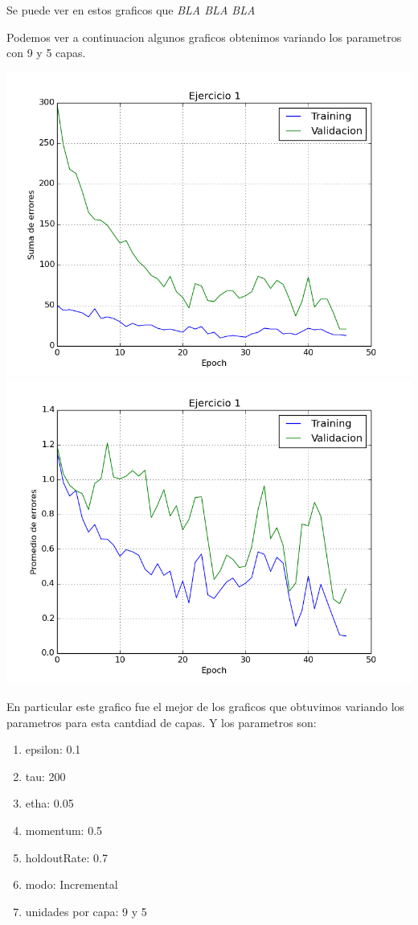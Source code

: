 Se puede ver en estos graficos que \emph{\color{red} BLA BLA BLA}

Podemos ver a continuacion algunos graficos obtenimos variando los parametros con 9 y 5 capas.


\includegraphics[scale=0.4]{img/ej100505195sum}
\includegraphics[scale=0.4]{img/ej100505195mean}


En particular este grafico fue el mejor de los graficos que obtuvimos variando los parametros para esta cantdiad de capas. Y los parametros son:
\begin{enumerate}
\item epsilon: 0.1
\item tau: 200
\item etha: 0.05
\item momentum: 0.5
\item holdoutRate: 0.7
\item modo: Incremental
\item unidades por capa: 9 y 5
\end{enumerate}

